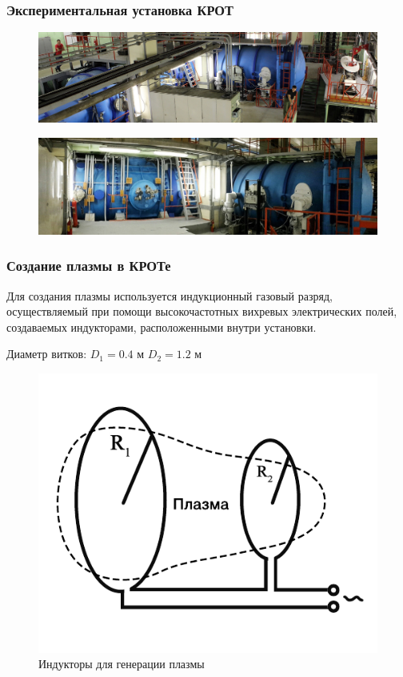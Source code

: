 \documentclass[10pt,pdf,hyperref={unicode}, dvipsnames]{beamer}
\begin{document}
\begin{frame}[t]\frametitle{Экспериментальная установка КРОТ}

\begin{figure}[H]
	\centering
	\vspace{-5pt}
	\includegraphics[width=\linewidth]{fig/KROT.JPG}
	\caption*{}
	\label{fig:krot_photo}
\end{figure}
\begin{figure}[H]
	\centering
	\vspace{-5pt}
	\includegraphics[width=\linewidth]{fig/KROT1.JPG}
	\caption*{}
	\label{fig:krot_photo}
\end{figure}



\end{frame}
\begin{frame}
	\frametitle{Создание плазмы в КРОТе}

		Для создания плазмы используется индукционный газовый разряд, осуществляемый при помощи высокочастотных вихревых электрических
	полей, создаваемых индукторами, расположенными внутри установки.

	Диаметр витков: $D_1=0.4$ м $D_2=1.2$ м

	\begin{figure}[H]
		\begin{minipage}{\linewidth}
				\centering
				\includegraphics[width=0.6\linewidth]{fig/induct}
				\vspace{-25pt}
				\caption*{Индукторы для генерации плазмы}

				\label{fig:resonator}
		\end{minipage}
		\end{figure}
\end{frame}
\end{document}
